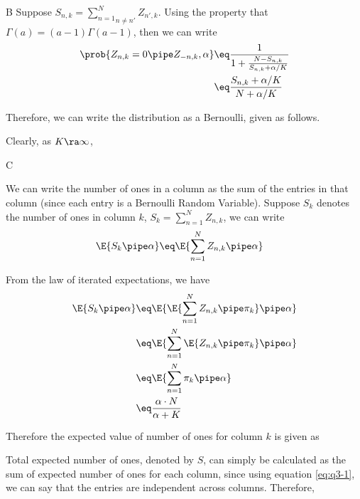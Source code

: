 \documentclass{article}
\begin{document}
\begin{question}
\begin{qpart}{B}
		Suppose $S_{n, k} = \underset{n \ne n'}{\sum_{n = 1}^N} Z_{n', k}$. Using the property that $\Gamma(a) = (a - 1) \Gamma(a - 1)$, then we can write
		\begin{align*}
			\prob{Z_{n, k} = 0 \pipe Z_{- n, k}, \alpha} &\eq	\frac{1}{1 + \frac{N - S_{n, k}}{S_{n, k} + \alpha / K}} \\
			&\eq	\frac{S_{n, k} + \alpha / K}{N + \alpha / K}
		\end{align*}

		Therefore, we can write the distribution as a Bernoulli, given as follows.

		Clearly, as $K \ra \infty$,

	\end{qpart}

	\begin{qpart}{C}

		We can write the number of ones in a column as the sum of the entries in that column (since each entry is a Bernoulli Random Variable). Suppose $S_k$ denotes the number of ones in column $k$, \ie $S_k = \sum_{n = 1}^N Z_{n, k}$, we can write
		\begin{align*}
			\E{S_k \pipe \alpha} &\eq \E{\sum_{n = 1}^N Z_{n, k} \pipe \alpha}
		\end{align*}

		From the law of iterated expectations, we have
		\begin{align*}
			\E{S_k \pipe \alpha} &\eq \E{\E{\sum_{n = 1}^N Z_{n, k} \pipe \pi_k} \pipe \alpha} \\
			&\eq \E{\sum_{n = 1}^N \E{Z_{n, k} \pipe \pi_k} \pipe \alpha} \\
			&\eq \E{\sum_{n = 1}^N \pi_k \pipe \alpha} \\
			&\eq \frac{\alpha \cdot N}{\alpha + K}
		\end{align*}

		Therefore the expected value of number of ones for column $k$ is given as

		Total expected number of ones, denoted by $S$, can simply be calculated as the sum of expected number of ones for each column, since using equation \ref{eq:q3-1}, we can say that the entries are independent across columns. Therefore,

	\end{qpart}

\end{question}
\end{document}
